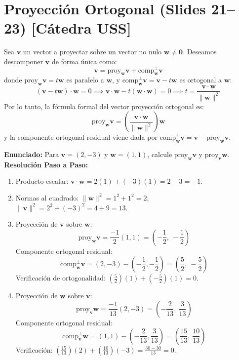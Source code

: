\documentclass[10pt,letterpaper]{article}
\newcommand{\proy}{\mathrm{proy}}
\newcommand{\comp}{\mathrm{comp}}
\newcommand{\vv}{\mathbf{v}}
\newcommand{\vw}{\mathbf{w}}
\begin{document}
\section{Proyección Ortogonal (Slides 21--23) [Cátedra USS]}

\begin{cajaTeorema}
Sea $\vv$ un vector a proyectar sobre un vector no nulo $\vw \neq \mathbf{0}$. Deseamos descomponer $\vv$ de forma única como:
\[
\vv = \proy_{\vw}\vv + \comp^\perp_{\vw}\vv
\]
donde $\proy_{\vw}\vv = t\vw$ es paralelo a $\vw$, y $\comp^\perp_{\vw}\vv = \vv - t\vw$ es ortogonal a $\vw$:
\[
(\vv - t\vw) \cdot \vw = 0 \implies \vv \cdot \vw - t(\vw \cdot \vw) = 0 \implies t = \frac{\vv \cdot \vw}{\|\vw\|^2}
\]
Por lo tanto, la fórmula formal del vector proyección ortogonal es:
\[
\proy_{\vw}\vv = \left(\frac{\vv \cdot \vw}{\|\vw\|^2}\right)\vw
\]
y la componente ortogonal residual viene dada por $\comp^\perp_{\vw}\vv = \vv - \proy_{\vw}\vv$.
\end{cajaTeorema}

\begin{cajaEjemplo}
\textbf{Enunciado:} Para $\vv = (2, -3)$ y $\vw = (1, 1)$, calcule $\proy_{\vw}\vv$ y $\proy_{\vv}\vw$.\\[0.15cm]
\textbf{Resolución Paso a Paso:}
\begin{enumerate}
    \item Producto escalar: $\vv \cdot \vw = 2(1) + (-3)(1) = 2 - 3 = -1$.
    \item Normas al cuadrado: $\|\vw\|^2 = 1^2 + 1^2 = 2$; $\|\vv\|^2 = 2^2 + (-3)^2 = 4 + 9 = 13$.
    \item Proyección de $\vv$ sobre $\vw$:
    \[
    \proy_{\vw}\vv = \frac{-1}{2}(1, 1) = \left(-\frac{1}{2},\ -\frac{1}{2}\right)
    \]
    Componente ortogonal residual:
    \[
    \comp^\perp_{\vw}\vv = (2, -3) - \left(-\frac{1}{2}, -\frac{1}{2}\right) = \left(\frac{5}{2},\ -\frac{5}{2}\right)
    \]
    Verificación de ortogonalidad: $\left(\frac{5}{2}\right)(1) + \left(-\frac{5}{2}\right)(1) = 0$.
    \item Proyección de $\vw$ sobre $\vv$:
    \[
    \proy_{\vv}\vw = \frac{-1}{13}(2, -3) = \left(-\frac{2}{13},\ \frac{3}{13}\right)
    \]
    Componente ortogonal residual:
    \[
    \comp^\perp_{\vv}\vw = (1, 1) - \left(-\frac{2}{13}, \frac{3}{13}\right) = \left(\frac{15}{13},\ \frac{10}{13}\right)
    \]
    Verificación: $\left(\frac{15}{13}\right)(2) + \left(\frac{10}{13}\right)(-3) = \frac{30 - 30}{13} = 0$.
\end{enumerate}
\end{cajaEjemplo}
\end{document}
